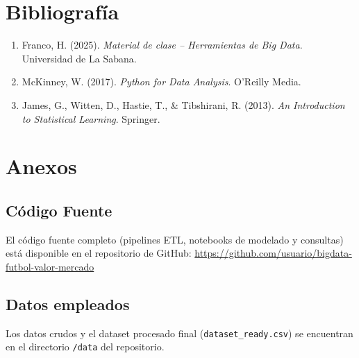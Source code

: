 \documentclass[12pt,letterpaper]{article}
\begin{document}
\section{Bibliografía}
\begin{enumerate}
    \item Franco, H. (2025). \textit{Material de clase – Herramientas de Big Data}. Universidad de La Sabana.
    \item McKinney, W. (2017). \textit{Python for Data Analysis}. O'Reilly Media.
    \item James, G., Witten, D., Hastie, T., \& Tibshirani, R. (2013). \textit{An Introduction to Statistical Learning}. Springer.
\end{enumerate}

\section{Anexos}
\subsection{Código Fuente}
El código fuente completo (pipelines ETL, notebooks de modelado y consultas) está disponible en el repositorio de GitHub:  
\url{https://github.com/usuario/bigdata-futbol-valor-mercado}

\subsection{Datos empleados}
Los datos crudos y el dataset procesado final (\texttt{dataset\_ready.csv}) se encuentran en el directorio \texttt{/data} del repositorio.
\end{document}
